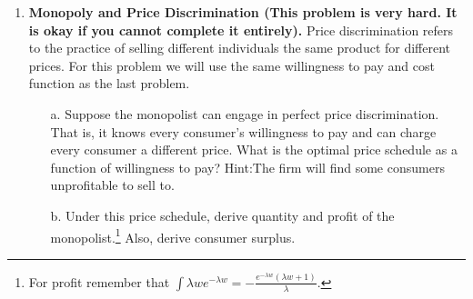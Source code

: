 \documentclass{article}
\begin{document}
\begin{enumerate}
\begin{enumerate}
        \item[d.] Setup the monopolist's profit maximization problem. Solve the monopolist's profit maximization problem to derive monopoly quantity, price and profit.
        
        \vspace{5cm}
        
        
        \item[e.] Derive the price and quantity under perfect competition. Plot the monopoly and perfect competition outcomes on a graph with the marginal cost, marginal revenue (under monopoly), and inverse demand.
        
        \vspace{6cm}
        
        
        \item[f.] Derive consumer surplus (see lecture notes for formula) as a function of $\lambda$ under monopoly. Derive consumer surplus under perfect competition. Divide monopoly consumer surplus by perfect competition consumer surplus. How does the ratio depend on $\lambda$? What is the interpretation? (See N\&S 14.3 for inspiration).\footnote{It may be helpful to recall that $\lim_{x \to 0} x log(x)=0$.}
        
        \vspace{5cm}
        
    \end{enumerate}
    \item \textbf{Monopoly and Price Discrimination (This problem is very hard. It is okay if you cannot complete it entirely).} Price discrimination refers to the practice of selling different individuals the same product for different prices. For this problem we will use the same willingness to pay and cost function as the last problem.
    \begin{enumerate}
        \item[a.] Suppose the monopolist can engage in perfect price discrimination. That is, it knows every consumer's willingness to pay and can charge every consumer a different price. What is the optimal price schedule as a function of willingness to pay? Hint:The firm will find some consumers unprofitable to sell to.
        
        \vspace{4cm}
        
        \item[b.] Under this price schedule, derive quantity and profit of the monopolist.\footnote{For profit remember that $\int \lambda w e^{-\lambda w} = -\frac{e^{-\lambda w}(\lambda w +1)}{\lambda} $.} Also, derive consumer surplus.
        

\end{enumerate}
\end{enumerate}
\end{document}
